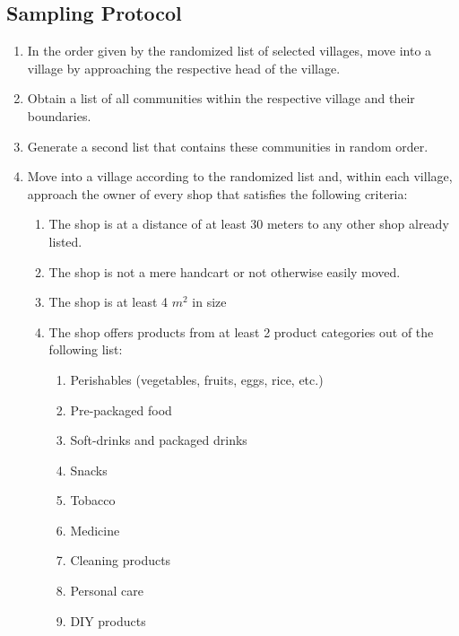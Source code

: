 \documentclass[11.5pt]{article}
\begin{document}
\begin{appendices}
\section{Sampling Protocol} \label{sec:appendixd}
\begin{enumerate}

	\item In the order given by the randomized list of selected villages, move 					into a village by approaching the respective head of the village.

	\item Obtain a list of all communities within the respective village and their 				boundaries.
	
	\item Generate a second list that contains these communities in random order.

	\item Move into a village according to the randomized list and, within each 				village, approach the owner of every shop that satisfies the following 				criteria:

	\begin{enumerate}
	
		\item The shop is at a distance of at least 30 meters to any other shop 					already listed.

		\item The shop is not a mere handcart or not otherwise easily moved.

		\item The shop is at least 4 $m^2$ in size

		\item The shop offers products from at least 2 product categories out of 					the following list:

		\begin{enumerate}


			\item Perishables (vegetables, fruits, eggs, rice, etc.)
			\item Pre-packaged food
			\item Soft-drinks and packaged drinks
			\item Snacks
			\item Tobacco
			\item Medicine
			\item Cleaning products
			\item Personal care
			\item DIY products


\end{enumerate}
\end{enumerate}
\end{enumerate}
\end{appendices}
\end{document}
